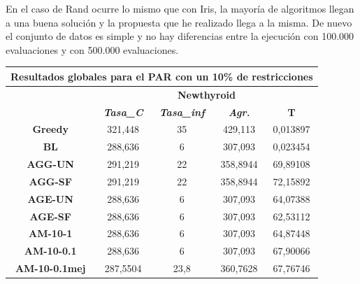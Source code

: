 \documentclass[12pt, spanish]{article}
\begin{document}
En el caso de Rand ocurre lo mismo que con Iris, la mayoría de algoritmos llegan a una buena solución y la propuesta que he realizado llega a la misma. De nuevo el conjunto de datos es simple y no hay diferencias entre la ejecución con 100.000 evaluaciones y con 500.000 evaluaciones.


\begin{table}[H]
\centering
\begin{tabular}{|c|c|c|c|c|}
\hline
\multicolumn{5}{|c|}{\textbf{Resultados globales para el PAR con un 10\% de restricciones}}                                 \\ \hline
\multirow{2}{*}{}           & \multicolumn{4}{c|}{\textbf{Newthyroid}}                                                      \\ \cline{2-5} 
                            & \textit{\textbf{Tasa\_C}} & \textit{\textbf{Tasa\_inf}} & \textit{\textbf{Agr.}} & \textbf{T} \\ \hline
\textbf{Greedy}             & 321,448                   & 35                          & 429,113                & 0,013897   \\ \hline
\textbf{BL}                 & 288,636                   & 6                           & 307,093                & 0,023454   \\ \hline
\textbf{AGG-UN}             & 291,219                   & 22                          & 358,8944               & 69,89108   \\ \hline
\textbf{AGG-SF}             & 291,219                   & 22                          & 358,8944               & 72,15892   \\ \hline
\textbf{AGE-UN}             & 288,636                   & 6                           & 307,093                & 64,07388   \\ \hline
\textbf{AGE-SF}             & 288,636                   & 6                           & 307,093                & 62,53112   \\ \hline
\textbf{AM-10-1}            & 288,636                   & 6                           & 307,093                & 64,87448   \\ \hline
\textbf{AM-10-0.1}          & 288,636                   & 6                           & 307,093                & 67,90066   \\ \hline
\textbf{AM-10-0.1mej}       & 287,5504                  & 23,8                        & 360,7628               & 67,76746   \\ \hline

\end{tabular}
\end{table}
\end{document}
